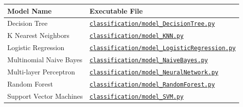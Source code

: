 \documentclass{article}
\begin{document}
\begin{table}[!htbp] \centering 
	\caption{ Model \& file containing corresponding \texttt{hyperparameter\_values} definition.}
	\label{tab:hyperparameters}
\begin{longtable}[]{@{}ll@{}}
\toprule
Model Name & Executable File \\
\midrule
\endhead
Decision Tree           & \href{https://github.com/recursion-ninja/CSc-CSc-74020/tree/master/src/classification/model_DecisionTree.py       }{\texttt{classification/model\_DecisionTree.py}} \\
K Nearest Neighbors     & \href{https://github.com/recursion-ninja/CSc-CSc-74020/tree/master/src/classification/model_KNN.py                }{\texttt{classification/model\_KNN.py}} \\
Logistic Regression     & \href{https://github.com/recursion-ninja/CSc-CSc-74020/tree/master/src/classification/model_LogisticRegression.py }{\texttt{classification/model\_LogisticRegression.py}} \\
Multinomial Naive Bayes & \href{https://github.com/recursion-ninja/CSc-CSc-74020/tree/master/src/classification/model_NaiveBayes.py         }{\texttt{classification/model\_NaiveBayes.py}} \\
Multi-layer Perceptron  & \href{https://github.com/recursion-ninja/CSc-CSc-74020/tree/master/src/classification/model_NeuralNetwork.py      }{\texttt{classification/model\_NeuralNetwork.py}} \\
Random Forest           & \href{https://github.com/recursion-ninja/CSc-CSc-74020/tree/master/src/classification/model_RandomForest.py       }{\texttt{classification/model\_RandomForest.py}} \\
Support Vector Machines & \href{https://github.com/recursion-ninja/CSc-CSc-74020/tree/master/src/classification/model_SVM.py                }{\texttt{classification/model\_SVM.py}} \\
\bottomrule
\end{longtable}
\end{table}
\end{document}
